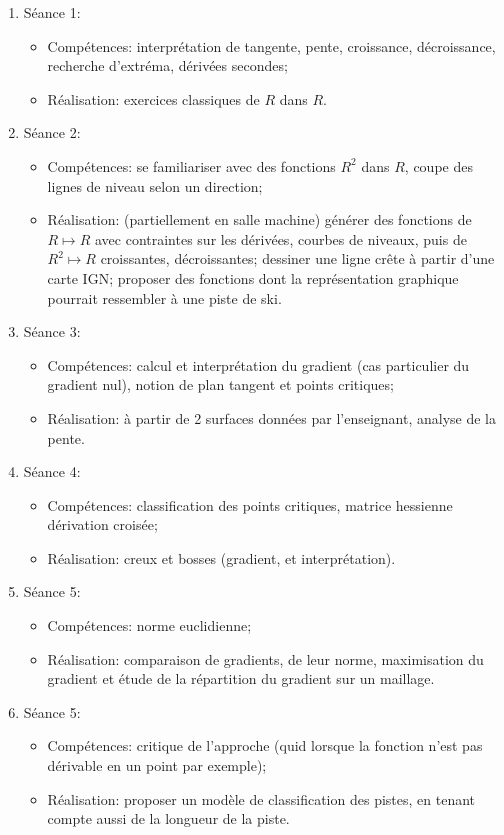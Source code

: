 \documentclass[11pt,a4paper,french]{article}
\begin{document}
\begin{enumerate}
\item Séance 1: 
\begin{itemize}
\item Compétences:  interprétation de 
tangente, pente, croissance, décroissance, recherche d'extréma, dérivées secondes;
\item Réalisation: exercices classiques de $R$ dans $R$. 
\end{itemize}

\item Séance 2: 

\begin{itemize}
\item Compétences: se familiariser avec des fonctions $R^2$ dans $R$, coupe des lignes de niveau selon un direction;
\item Réalisation: (partiellement en salle machine) générer des fonctions  de 
$R \mapsto R$ avec contraintes sur les dérivées, 
courbes de niveaux,  puis de $R^2 \mapsto R$ croissantes, décroissantes;
dessiner une ligne crête à partir d'une carte IGN; 
proposer des fonctions dont la représentation graphique pourrait ressembler à une piste de ski. 
\end{itemize}

\item Séance 3: 
\begin{itemize}
\item Compétences: calcul et interprétation du gradient (cas particulier du gradient nul), notion de plan tangent et points critiques;
\item Réalisation:  à partir de 2 surfaces données par l'enseignant, analyse de la pente.
\end{itemize}



\item Séance 4: 
\begin{itemize}
\item Compétences: classification des points critiques, 
  matrice hessienne dérivation croisée;
\item Réalisation: creux et bosses (gradient,  et interprétation).
\end{itemize}


\item Séance 5: 
\begin{itemize}
\item Compétences: norme euclidienne;
\item Réalisation: comparaison de gradients, de leur norme, maximisation du gradient et étude de la répartition du gradient sur un maillage.
\end{itemize}

 

\item Séance 5: 
\begin{itemize}
\item Compétences: critique de l'approche (quid lorsque la fonction n'est pas dérivable en un point par exemple);
\item Réalisation:  proposer un modèle de classification des pistes, 
en tenant compte aussi de la longueur de la piste.
\end{itemize}
\end{enumerate}
\end{document}
